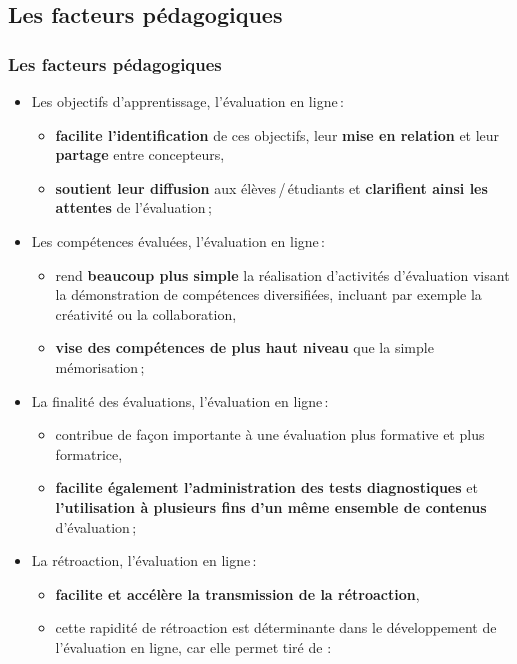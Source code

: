 \documentclass{beamer}
\begin{document}
		\subsection{Les facteurs pédagogiques} 
			\begin{frame}[allowframebreaks]
			 	\frametitle{Les facteurs pédagogiques \citet{audet2011a}}
				\begin {itemize}
					\item Les objectifs d'apprentissage, l'évaluation en ligne\,:
						\begin {itemize}
							\item \textbf{facilite l'identification} de ces objectifs, leur \textbf{mise en relation} et leur \textbf{partage} entre concepteurs,
							\item \textbf{soutient leur diffusion} aux élèves\,/\,étudiants et \textbf{clarifient ainsi les attentes} de l'évaluation\,;
						\end{itemize}
					\item Les compétences évaluées, l'évaluation en ligne\,:
						\begin {itemize}
							\item rend \textbf{beaucoup plus simple} la réalisation d'activités d'évaluation visant la démonstration de compétences diversifiées, incluant par exemple la créativité ou la collaboration,
							\item \textbf{vise des compétences de plus haut niveau} que la simple mémorisation\,;
						\end{itemize}
					\item La finalité des évaluations, l'évaluation en ligne\,:
						\begin {itemize}
							\item contribue de façon importante à une {évaluation plus formative et plus formatrice},
							\item \textbf{facilite également l'administration des tests diagnostiques} et \textbf{l'utilisation à plusieurs fins d'un même ensemble de contenus} d'évaluation\,;					
						\end{itemize}
					\framebreak
					\item La rétroaction, l'évaluation en ligne\,: 
						\begin {itemize}
							\item \textbf{facilite et accélère la transmission de la rétroaction},
							\item cette rapidité de rétroaction est déterminante dans le développement de l'évaluation en ligne, car elle permet \citep{whitelock2006a} tiré de \citet{audet2011a}  :

\end{itemize}
\end{itemize}
\end{frame}
\end{document}
